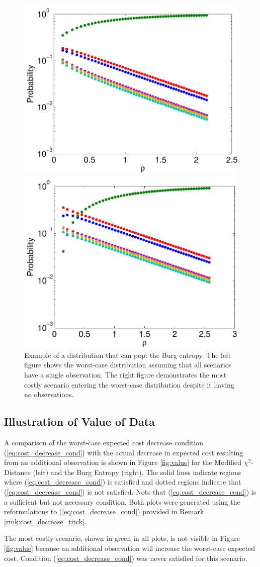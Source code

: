 \documentclass[ijoc,letterpaper]{informs3} %
\begin{document}
\begin{figure}
	\FIGURE
	{%
		\includegraphics*[width=.42\textwidth]{images/burg}%
		\includegraphics*[width=.42\textwidth]{images/burg_zero}%
	}
	{
		Example of a distribution that can pop: the Burg entropy.
		The left figure shows the worst-case distribution assuming that all scenarios have a single observation.
		The right figure demonstrates the most costly scenario entering the worst-case distribution despite it having no observations.
		\label{fig:pop}
	}
	{}
\end{figure}

\subsection{Illustration of Value of Data}
\label{ssec:numerical_value_of_data}

A comparison of the worst-case expected cost decrease condition (\ref{eq:cost_decrease_cond}) with the actual decrease in expected cost resulting from an additional observation is shown in Figure \ref{fig:value} for the Modified $\chi^2$-Distance (left) and the Burg Entropy (right).
The solid lines indicate regions where (\ref{eq:cost_decrease_cond}) is satisfied and dotted regions indicate that (\ref{eq:cost_decrease_cond}) is not satisfied.
Note that (\ref{eq:cost_decrease_cond}) is a sufficient but not necessary condition.
Both plots were generated using the reformulations to (\ref{eq:cost_decrease_cond}) provided in Remark \ref{rmk:cost_decrease_trick}.

The most costly scenario, shown in green in all plots, is not visible in Figure \ref{fig:value} because an additional observation will increase the worst-case expected cost.
Condition (\ref{eq:cost_decrease_cond}) was never satisfied for this scenario.
\end{document}
